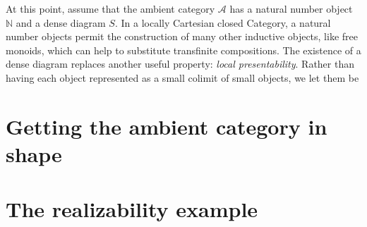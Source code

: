 \documentclass{tac}
\newcommand\hide[1]{}
\newcommand\cat\mathcal
\newcommand\nno{\mathbb N}
\begin{document}
At this point, assume that the ambient category $\cat A$ has a natural number object $\nno$ and a dense diagram $S$. In a locally Cartesian closed Category, a natural number objects permit the construction of many other inductive objects, like free monoids, which can help to substitute transfinite compositions. The existence of a dense diagram replaces another useful property: \emph{local presentability}. Rather than having each object represented as a small colimit of small objects, we let them be 










\hide{the difficulty is going to be showing that the construction delivers a presaturated diagram, and that may show presaturated diagram to be useless abstractions.}





\section{Getting the ambient category in shape}
\hide{
- nno's cycles & horns
- W-types
-	etc.
}

\section{The realizability example}
\hide{
- simplicial assemblies & modest sets.
- exact completions for pushouts.
- exact completions as examples of homotopy categories.
}
\end{document}
